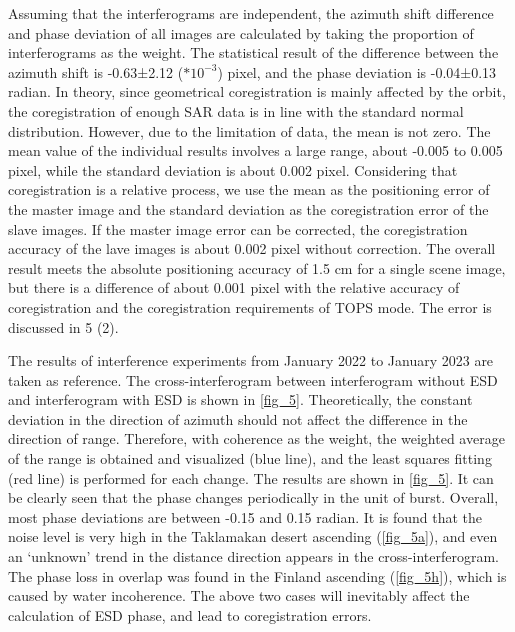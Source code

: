 \documentclass[preprint, authoryear]{elsarticle}
\begin{document}
Assuming that the interferograms are independent, the azimuth shift difference and phase deviation of all images are calculated by taking the proportion of interferograms as the weight. The statistical result of the difference between the azimuth shift is -0.63±2.12 ($*10^{-3}$) pixel, and the phase deviation is -0.04±0.13 radian. In theory, since geometrical coregistration is mainly affected by the orbit, the coregistration of enough SAR data is in line with the standard normal distribution. However, due to the limitation of data, the mean is not zero. The mean value of the individual results involves a large range, about -0.005 to 0.005 pixel, while the standard deviation is about 0.002 pixel. Considering that coregistration is a relative process, we use the mean as the positioning error of the master image and the standard deviation as the coregistration error of the slave images. If the master image error can be corrected, the coregistration accuracy of the lave images is about 0.002 pixel without correction. The overall result meets the absolute positioning accuracy of 1.5 cm for a single scene image, but there is a difference of about 0.001 pixel with the relative accuracy of coregistration and the coregistration requirements of TOPS mode. The error is discussed in 5 (2). \par

The results of interference experiments from January 2022 to January 2023 are taken as reference. The cross-interferogram between interferogram without ESD and interferogram with ESD is shown in \ref{fig_5}. Theoretically, the constant deviation in the direction of azimuth should not affect the difference in the direction of range. Therefore, with coherence as the weight, the weighted average of the range is obtained and visualized (blue line), and the least squares fitting (red line) is performed for each change. The results are shown in \ref{fig_5}. It can be clearly seen that the phase changes periodically in the unit of burst. Overall, most phase deviations are between -0.15 and 0.15 radian. It is found that the noise level is very high in the Taklamakan desert ascending (\ref{fig_5a}), and even an ‘unknown’ trend in the distance direction appears in the cross-interferogram. The phase loss in overlap was found in the Finland ascending (\ref{fig_5h}), which is caused by water incoherence. The above two cases will inevitably affect the calculation of ESD phase, and lead to coregistration errors. \par
\end{document}
